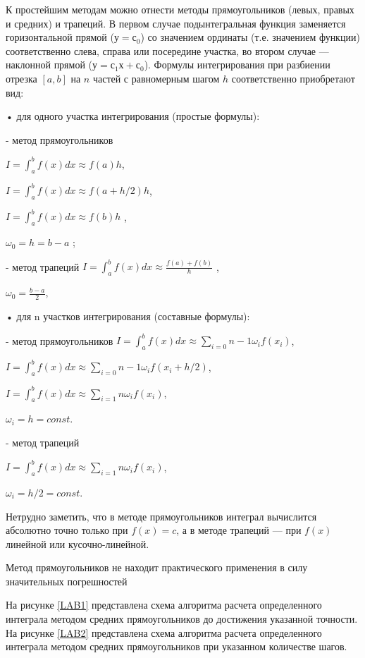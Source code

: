 К простейшим методам можно отнести методы прямоугольников (левых, правых и средних) и трапеций. В первом случае подынтегральная функция заменяется горизонтальной прямой ($у =с_0$) со значением ординаты (т.е. значением функции) соответственно слева, справа или посередине участка, во втором случае — наклонной прямой ($у=с_1х+с_0$).
Формулы интегрирования при разбиении отрезка $[a,b]$ на $n$ частей с равномерным шагом $h$ соответственно приобретают вид:

• для одного участка интегрирования (простые формулы):

- метод прямоугольников
  
$I=\int_a^b f(x) dx\approx f(a) h$,

$I=\int_a^b f(x) dx\approx f(a+h/2) h$,
 
$I=\int_a^b f(x) dx\approx f(b) h$ ,

$\omega_0=h=b-a$ ;

- метод трапеций
 $I=\int_a^b f(x) dx\approx \frac{f(a)+f(b)}h$ ,

$\omega_0=\frac{b-a}2 $,

• для n участков интегрирования (составные формулы):

- метод прямоугольников
 $I=\int_a^b f(x) dx\approx \sum_{i=0}{n-1}\omega_i f(x_i)$,
 
 $I=\int_a^b f(x) dx\approx \sum_{i=0}{n-1}\omega_i f(x_i+h/2)$,

 $I=\int_a^b f(x) dx\approx \sum_{i=1}{n}\omega_i f(x_i)$,

$\omega_i=h=const$.

- метод трапеций
 
$I=\int_a^b f(x) dx\approx \sum_{i=1}{n}\omega_i f(x_i)$,

$\omega_i=h/2=const$.

Нетрудно заметить, что в методе прямоугольников интеграл вычислится абсолютно точно только при $f(x) = c $, а в методе трапеций — при $f(x)$ линейной или кусочно-линейной.

Метод прямоугольников не находит практического применения в силу значительных погрешностей

На рисунке \ref{LAB1} представлена схема алгоритма расчета определенного интеграла методом средних прямоугольников
до достижения указанной точности.
На рисунке \ref{LAB2} представлена схема алгоритма  расчета определенного интеграла методом средних прямоугольников
при указанном количестве шагов.

